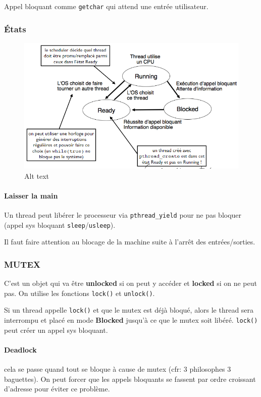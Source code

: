 Appel bloquant comme \texttt{getchar} qui attend une entrée utilisateur.

\subsubsection{États}\label{uxe9tats}

\begin{figure}
\centering
\includegraphics{image-24.png}
\caption{Alt text}
\end{figure}

\paragraph{Laisser la main}\label{laisser-la-main}

Un thread peut libérer le processeur via \texttt{pthread\_yield} pour ne
pas bloquer (appel sys bloquant \texttt{sleep}/\texttt{usleep}).

Il faut faire attention au blocage de la machine suite à l'arrêt des
entrées/sorties.

\subsubsection{MUTEX}\label{mutex}

C'est un objet qui va être \textbf{unlocked} si on peut y accéder et
\textbf{locked} si on ne peut pas. On utilise les fonctions
\texttt{lock()} et \texttt{unlock()}.

Si un thread appelle \texttt{lock()} et que le mutex est déjà bloqué,
alors le thread sera interrompu et placé en mode \textbf{Blocked}
jusqu'à ce que le mutex soit libéré. \texttt{lock()} peut créer un appel
sys bloquant.

\paragraph{Deadlock}\label{deadlock}

cela se passe quand tout se bloque à cause de mutex (cfr: 3 philosophes
3 baguettes). On peut forcer que les appels bloquants se fassent par
ordre croissant d'adresse pour éviter ce problème.
